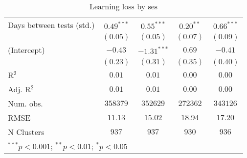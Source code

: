 \begin{table}
\begin{center}
\begin{tabular}{l c c c c}
Days between tests (std.)   & $0.49^{***}$  & $0.55^{***}$  & $0.20^{**}$   & $0.66^{***}$  \\
                            & $(0.05)$      & $(0.05)$      & $(0.07)$      & $(0.09)$      \\
(Intercept)                 & $-0.43$       & $-1.31^{***}$ & $0.69$        & $-0.41$       \\
                            & $(0.23)$      & $(0.31)$      & $(0.35)$      & $(0.40)$      \\
\hline
R$^2$                       & $0.01$        & $0.01$        & $0.00$        & $0.00$        \\
Adj. R$^2$                  & $0.01$        & $0.01$        & $0.00$        & $0.00$        \\
Num. obs.                   & $358379$      & $352629$      & $272362$      & $343126$      \\
RMSE                        & $11.13$       & $15.02$       & $18.94$       & $17.20$       \\
N Clusters                  & $937$         & $937$         & $930$         & $936$         \\
\hline
\multicolumn{5}{l}{\scriptsize{$^{***}p<0.001$; $^{**}p<0.01$; $^{*}p<0.05$}}
\end{tabular}
\caption{Learning loss by ses}
\label{tableses}
\end{center}
\end{table}
